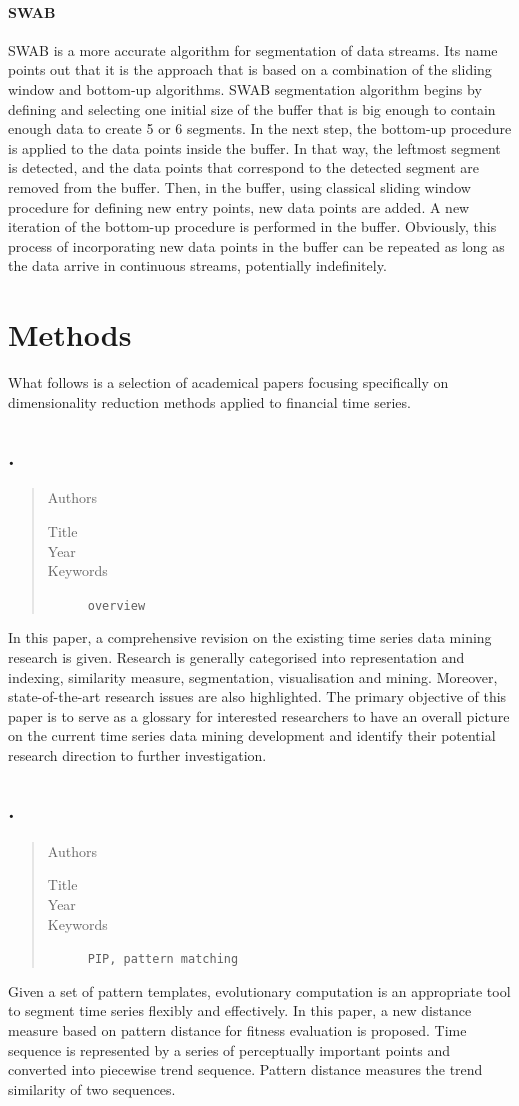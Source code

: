 \documentclass[a4paper]{article}
\newcommand{\newpaper}[2]{\subsection*{\cite{#1}. \citetitle{#1}}

\begin{framed}\begin{quote}\begin{description}
	\item [Authors]\citeauthor{#1}
	\item [Title]\citetitle{#1}
	\item [Year]\citedate{#1}
	\item [Keywords]\texttt{#2}
\end{description}\end{quote}\end{framed}

}
\begin{document}
\paragraph{SWAB} SWAB is a more accurate algorithm for segmentation of data streams. Its name points out that it is the approach that is based on a combination of the sliding window and bottom-up algorithms. SWAB segmentation algorithm begins by defining and selecting one initial size of the buffer that is big enough to contain enough data to create 5 or 6 segments. In the next step, the bottom-up procedure is applied to the data points inside the buffer. In that way, the leftmost segment is detected, and the data points that correspond to the detected segment are removed from the buffer. Then, in the buffer, using classical sliding window procedure for defining new entry points, new data points are added. A new iteration of the bottom-up procedure is performed in the buffer. Obviously, this process of incorporating new data points in the buffer can be repeated as long as the data arrive in continuous streams, potentially indefinitely. 





\section{Methods}\label{sec:methods}
 
What follows is a selection of academical papers focusing specifically on dimensionality reduction methods applied to financial time series. 


\newpaper{Fu2011164}{overview}
In this paper, a comprehensive revision on the existing time series data mining research is given. Research is generally categorised into representation and indexing, similarity measure, segmentation, visualisation and mining. Moreover, state-of-the-art research issues are also highlighted. The primary objective of this paper is to serve as a glossary for interested researchers to have an overall picture on the current time series data mining development and identify their potential research direction to further investigation. 


\newpaper{Yu2006}{PIP, pattern matching} 
Given a set of pattern templates, evolutionary computation is an appropriate tool to segment time series flexibly and effectively. In this paper, a new distance measure based on pattern distance for fitness evaluation is proposed. Time sequence is represented by a series of perceptually important points and converted into piecewise trend sequence. Pattern distance measures the trend similarity of two sequences.
\end{document}
